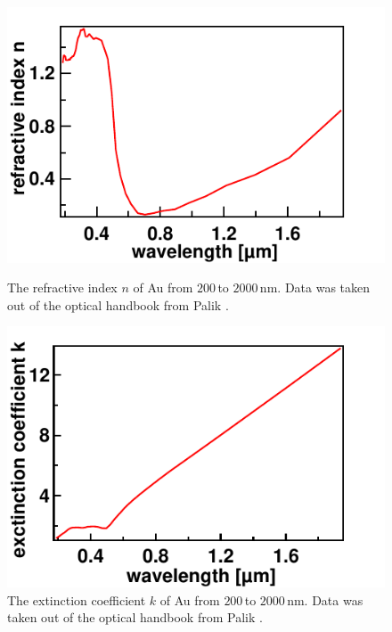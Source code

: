 \documentclass[a4paper,12pt,twoside]{article}
\begin{document}
 	\begin{figure}[H]
 	    \begin{minipage}[t]{.45\linewidth}
        	\includegraphics[width=\linewidth]{figures/nau.pdf}
			\caption{The refractive index $n$ of Au from $200\,\mathrm{}$to $2000\,\mathrm{nm}$. Data was taken out of the optical handbook from Palik \cite{palik1991handbook}.}
			    \label{nau}
		\end{minipage}
			\hspace{.075\linewidth}
		\begin{minipage}[t]{.45\linewidth}
			\includegraphics[width=\linewidth]{figures/kau.pdf}
			\caption{The extinction coefficient $k$ of Au from $200\,\mathrm{}$to $2000\,\mathrm{nm}$. Data was taken out of the optical handbook from Palik \cite{palik1991handbook}.}
			    \label{kau}
		\end{minipage}
	\end{figure}
\end{document}
